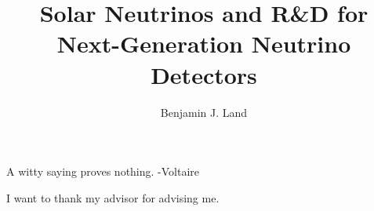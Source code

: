 \documentclass[12pt,letterpaper]{ucbthesis}
\begin{document}
\title{Solar Neutrinos and R\&D for Next-Generation Neutrino Detectors}
\author{Benjamin J. Land}
\maketitle
\approvalpage
\copyrightpage



\begin{frontmatter}

\begin{dedication}
\null\vfil
\begin{center}
A witty saying proves nothing. -Voltaire
\end{center}
\vfil\null
\end{dedication}

\tableofcontents
\clearpage
\listoffigures
\clearpage
\listoftables

\begin{acknowledgements}
I want to thank my advisor for advising me.
\end{acknowledgements}

\end{frontmatter}

\pagestyle{headings}







\printbibliography
\end{document}
